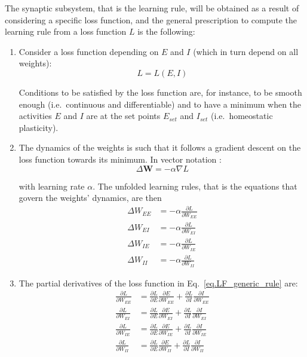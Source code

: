 \documentclass[
twocolumn,
]{article}
\newcommand{\EE}{\mathit{EE}}
\newcommand{\EI}{\mathit{EI}}
\newcommand{\IE}{\mathit{IE}}
\newcommand{\II}{\mathit{II}}
\newcommand{\set}{\mathit{set}}
\begin{document}
The synaptic subsystem, that is the learning rule, will be obtained as a result of considering a specific loss function, and the general prescription to compute the learning rule from a loss function $L$ is the following:
\begin{enumerate}
\item Consider a loss function depending on $E$ and $I$ (which in turn depend on all weights):
\begin{displaymath}
L = L(E,I)
\end{displaymath}

\noindent Conditions to be satisfied by the loss function are, for instance, to be smooth enough (i.e.\ continuous and differentiable) and to have a minimum when the activities $E$ and $I$ are at the set points $E_{\set}$ and $I_{\set}$ (i.e.\ homeostatic plasticity).

\item The dynamics of the weights is such that it follows a gradient descent on the loss function towards its minimum. In vector notation :
\begin{equation}
\Delta \mathbf{W} = -\alpha \nabla L
\label{eq.LF_gradient}
\end{equation}

\noindent with learning rate $\alpha$. The unfolded learning rules, that is the equations that govern the weights' dynamics, are then
\begin{equation}
\begin{aligned}
\Delta W_{\EE} & = - \alpha \frac{\partial L}{\partial W_{\EE}} \\
\Delta W_{\EI} & = - \alpha \frac{\partial L}{\partial W_{\EI}} \\
\Delta W_{\IE} & = - \alpha \frac{\partial L}{\partial W_{\IE}} \\
\Delta W_{\II} & = - \alpha \frac{\partial L}{\partial W_{\II}} \end{aligned}
\label{eq.LF_generic_rule}
\end{equation}


\item The partial derivatives of the loss function in Eq.\ \ref{eq.LF_generic_rule} are:
\begin{equation}
\begin{aligned}
\frac{\partial L}{\partial W_{\EE}} & = \frac{\partial L}{\partial E} \frac{\partial E}{\partial W_{\EE}} + \frac{\partial L}{\partial I} \frac{\partial I}{\partial W_{\EE}} \\
\frac{\partial L}{\partial W_{\EI}} & = \frac{\partial L}{\partial E} \frac{\partial E}{\partial W_{\EI}} + \frac{\partial L}{\partial I} \frac{\partial I}{\partial W_{\EI}} \\
\frac{\partial L}{\partial W_{\IE}} & = \frac{\partial L}{\partial E} \frac{\partial E}{\partial W_{\IE}} + \frac{\partial L}{\partial I} \frac{\partial I}{\partial W_{\IE}} \\
\frac{\partial L}{\partial W_{\II}} & = \frac{\partial L}{\partial E} \frac{\partial E}{\partial W_{\II}} + \frac{\partial L}{\partial I} \frac{\partial I}{\partial W_{\II}} \end{aligned}
\label{eq.LF_chain_rule}
\end{equation}


\end{enumerate}
\end{document}
